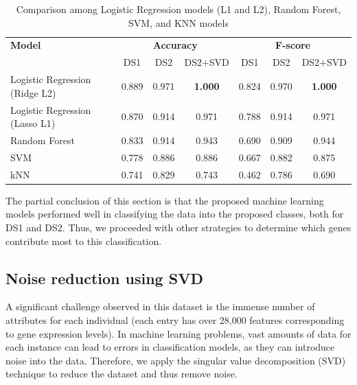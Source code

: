 \begin{table}[htbp] \centering
  \caption{Comparison among Logistic Regression models (L1 and L2), Random Forest, SVM, and KNN models}
   \label{tab:2-log-ref-mod}
  \begin{tabular}{l ccc ccc}
    \hline
    \textbf{Model}                 & \multicolumn{3}{c}{\textbf{Accuracy}} & \multicolumn{3}{c}{\textbf{F-score}}                                                   \\
                                   & DS1                                   & DS2                                  & DS2+SVD        & DS1   & DS2   & DS2+SVD        \\
    \hline
    Logistic Regression (Ridge L2) & 0.889                                 & 0.971                                & \textbf{1.000} & 0.824 & 0.970 & \textbf{1.000} \\
    Logistic Regression (Lasso L1) & 0.870                                 & 0.914                                & 0.971          & 0.788 & 0.914 & 0.971          \\
    Random Forest                  & 0.833                                 & 0.914                                & 0.943          & 0.690 & 0.909 & 0.944          \\
    SVM                            & 0.778                                 & 0.886                                & 0.886          & 0.667 & 0.882 & 0.875          \\
    kNN                            & 0.741                                 & 0.829                                & 0.743          & 0.462 & 0.786 & 0.690          \\
    \hline
  \end{tabular}
\end{table} %

The partial conclusion of this section is that the proposed machine learning models performed well in classifying the data into the proposed classes, both for DS1 and DS2. Thus, we proceeded with other strategies to determine which genes contribute most to this classification.

\subsection{Noise reduction using SVD} %

A significant challenge observed in this dataset is the immense number of attributes for each individual (each entry has over 28,000 features corresponding to gene expression levels). In machine learning problems, vast amounts of data for each instance can lead to errors in classification models, as they can introduce noise into the data. Therefore, we apply the singular value decomposition (SVD) technique to reduce the dataset and thus remove noise.

